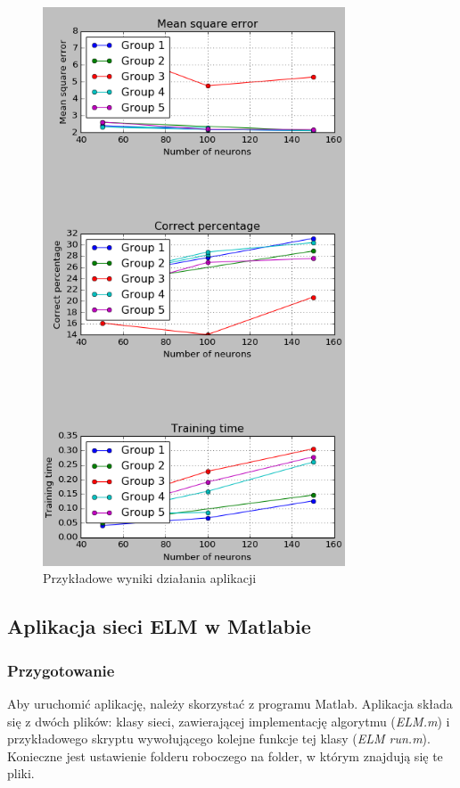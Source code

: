 \documentclass{article}
\begin{document}
\begin{figure}[H]
\centering
\includegraphics[width=0.8\textwidth]{instrukcja_python_end.png}
\caption{Przykładowe wyniki działania aplikacji}
\end{figure}
\clearpage
\subsection*{Aplikacja sieci ELM w Matlabie}
\subsubsection*{Przygotowanie}
Aby uruchomić aplikację, należy skorzystać z programu Matlab.
Aplikacja składa się z dwóch plików: klasy sieci, zawierającej implementację algorytmu (\textit{ELM.m}) i przykładowego skryptu wywołującego kolejne funkcje tej klasy (\textit{ELM \textunderscore run.m}).
Konieczne jest ustawienie folderu roboczego na folder, w którym znajdują się te pliki.
\end{document}
